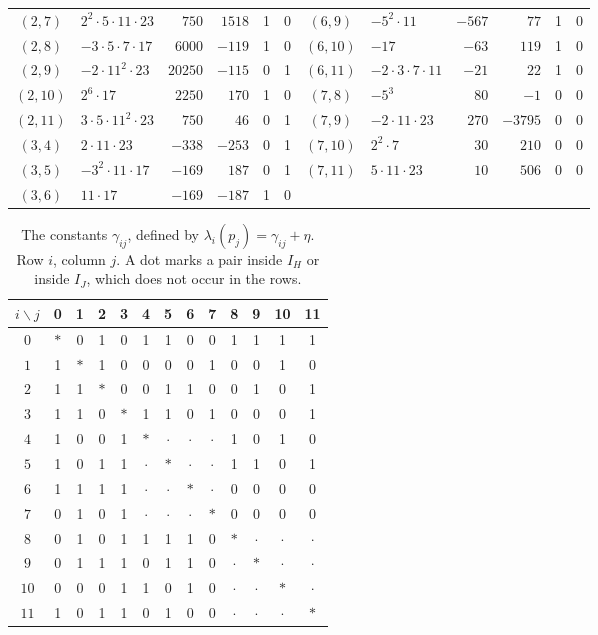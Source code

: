 \documentclass[12pt,oneside,openany]{book}
\theoremstyle{definition}
\theoremstyle{plain}
\numberwithin{equation}{chapter}
\theoremstyle{plain}
\theoremstyle{definition}
\theoremstyle{remark}
\begin{document}
\begin{table}[htbp]
\begin{tabular}{clrrcc@{\hspace{1.6em}}clrrcc}
$(2,7)$ & $2^{2}\cdot5\cdot11\cdot23$ & $750$ & $1518$ & 1 & 0 & $(6,9)$ & $-5^{2}\cdot11$ & $-567$ & $77$ & 1 & 0 \\
$(2,8)$ & $-3\cdot5\cdot7\cdot17$ & $6000$ & $-119$ & 1 & 0 & $(6,10)$ & $-17$ & $-63$ & $119$ & 1 & 0 \\
$(2,9)$ & $-2\cdot11^{2}\cdot23$ & $20250$ & $-115$ & 0 & 1 & $(6,11)$ & $-2\cdot3\cdot7\cdot11$ & $-21$ & $22$ & 1 & 0 \\
$(2,10)$ & $2^{6}\cdot17$ & $2250$ & $170$ & 1 & 0 & $(7,8)$ & $-5^{3}$ & $80$ & $-1$ & 0 & 0 \\
$(2,11)$ & $3\cdot5\cdot11^{2}\cdot23$ & $750$ & $46$ & 0 & 1 & $(7,9)$ & $-2\cdot11\cdot23$ & $270$ & $-3795$ & 0 & 0 \\
$(3,4)$ & $2\cdot11\cdot23$ & $-338$ & $-253$ & 0 & 1 & $(7,10)$ & $2^{2}\cdot7$ & $30$ & $210$ & 0 & 0 \\
$(3,5)$ & $-3^{2}\cdot11\cdot17$ & $-169$ & $187$ & 0 & 1 & $(7,11)$ & $5\cdot11\cdot23$ & $10$ & $506$ & 0 & 0 \\
$(3,6)$ & $11\cdot17$ & $-169$ & $-187$ & 1 & 0 & & & & & & \\
\bottomrule
\end{tabular}
\end{table}

\begin{table}[htbp]
\centering
\caption{The constants $\gamma_{ij}$, defined by $\lambda_i(p_j)=\gamma_{ij}+\eta$. Row $i$, column $j$. A dot marks a pair inside $I_H$ or inside $I_J$, which does not occur in the rows.}
\label{tab:r6-cross}
\begin{tabular}{c*{12}{c}}
\toprule
$i\backslash j$ & 0 & 1 & 2 & 3 & 4 & 5 & 6 & 7 & 8 & 9 & 10 & 11\\
\midrule
$0$ & $\ast$ & 0 & 1 & 0 & 1 & 1 & 0 & 0 & 1 & 1 & 1 & 1 \\
$1$ & 1 & $\ast$ & 1 & 0 & 0 & 0 & 0 & 1 & 0 & 0 & 1 & 0 \\
$2$ & 1 & 1 & $\ast$ & 0 & 0 & 1 & 1 & 0 & 0 & 1 & 0 & 1 \\
$3$ & 1 & 1 & 0 & $\ast$ & 1 & 1 & 0 & 1 & 0 & 0 & 0 & 1 \\
$4$ & 1 & 0 & 0 & 1 & $\ast$ & $\cdot$ & $\cdot$ & $\cdot$ & 1 & 0 & 1 & 0 \\
$5$ & 1 & 0 & 1 & 1 & $\cdot$ & $\ast$ & $\cdot$ & $\cdot$ & 1 & 1 & 0 & 1 \\
$6$ & 1 & 1 & 1 & 1 & $\cdot$ & $\cdot$ & $\ast$ & $\cdot$ & 0 & 0 & 0 & 0 \\
$7$ & 0 & 1 & 0 & 1 & $\cdot$ & $\cdot$ & $\cdot$ & $\ast$ & 0 & 0 & 0 & 0 \\
$8$ & 0 & 1 & 0 & 1 & 1 & 1 & 1 & 0 & $\ast$ & $\cdot$ & $\cdot$ & $\cdot$ \\
$9$ & 0 & 1 & 1 & 1 & 0 & 1 & 1 & 0 & $\cdot$ & $\ast$ & $\cdot$ & $\cdot$ \\
$10$ & 0 & 0 & 0 & 1 & 1 & 0 & 1 & 0 & $\cdot$ & $\cdot$ & $\ast$ & $\cdot$ \\
$11$ & 1 & 0 & 1 & 1 & 0 & 1 & 0 & 0 & $\cdot$ & $\cdot$ & $\cdot$ & $\ast$ \\
\bottomrule
\end{tabular}
\end{table}
\end{document}
